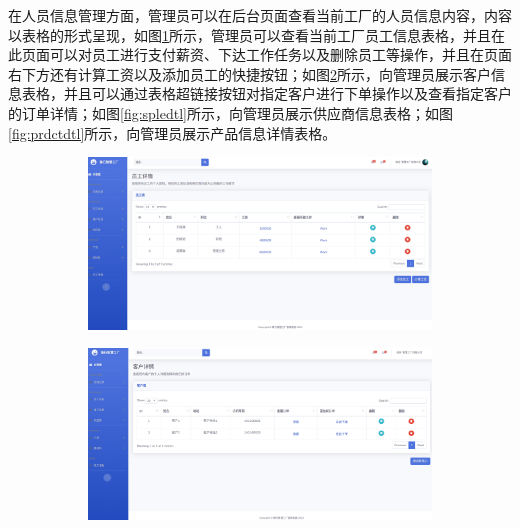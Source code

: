 在人员信息管理方面，管理员可以在后台页面查看当前工厂的人员信息内容，内容以表格的形式呈现，如图\ref{fig:empledtl}所示，管理员可以查看当前工厂员工信息表格，并且在此页面可以对员工进行支付薪资、下达工作任务以及删除员工等操作，并且在页面右下方还有计算工资以及添加员工的快捷按钮；如图\ref{fig:cstmdtl}所示，向管理员展示客户信息表格，并且可以通过表格超链接按钮对指定客户进行下单操作以及查看指定客户的订单详情；如图\ref{fig:spledtl}所示，向管理员展示供应商信息表格；如图\ref{fig:prdctdtl}所示，向管理员展示产品信息详情表格。

\begin{figure}[H]
    \centering
    \begin{subfigure}{.45\textwidth}
        \centering
        \includegraphics[width=\textwidth]{figures/5employeedetail.png}
        \label{fig:empledtl}
    \end{subfigure}
    \qquad
    \begin{subfigure}{.45\textwidth}
        \centering
        \includegraphics[width=\textwidth]{figures/5customerdetail.png}
        \label{fig:cstmdtl}
    \end{subfigure}
    \\
    \begin{subfigure}{.45\textwidth}

\end{subfigure}
\end{figure}
